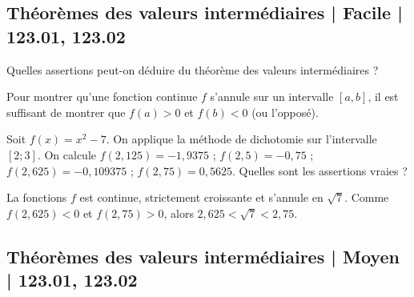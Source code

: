\subsection{Théorèmes des valeurs intermédiaires | Facile | 123.01, 123.02}


\begin{question}
Quelles assertions peut-on déduire du théorème des valeurs intermédiaires ?
\begin{answers}


    \good{$\ln(x+1)-x+1$ s'annule sur $[0,+\infty[$.}

\end{answers}
\begin{explanations}
Pour montrer qu'une fonction continue $f$ s'annule sur un intervalle $[a,b]$, il est suffisant de montrer que $f(a)>0$ et $f(b)<0$ (ou l'opposé).
\end{explanations}
\end{question}


\begin{question}
Soit $f(x)=x^2-7$. On applique la méthode de dichotomie sur l'intervalle $[2 ; 3]$. 
On calcule $f(2,125)=-1,9375$ ; $f(2,5) = -0,75$ ; $f(2,625) = -0,109375$ ; $f(2,75) = 0,5625$. Quelles sont les assertions vraies ?
\begin{answers}




\end{answers}
\begin{explanations}
La fonctions $f$ est continue, strictement croissante et s'annule en $\sqrt{7}$. 
Comme $f(2,625) < 0$ et $f(2,75) > 0$, alors
$2,625 < \sqrt{7} < 2,75$.
\end{explanations}
\end{question}




\subsection{Théorèmes des valeurs intermédiaires | Moyen | 123.01, 123.02}


